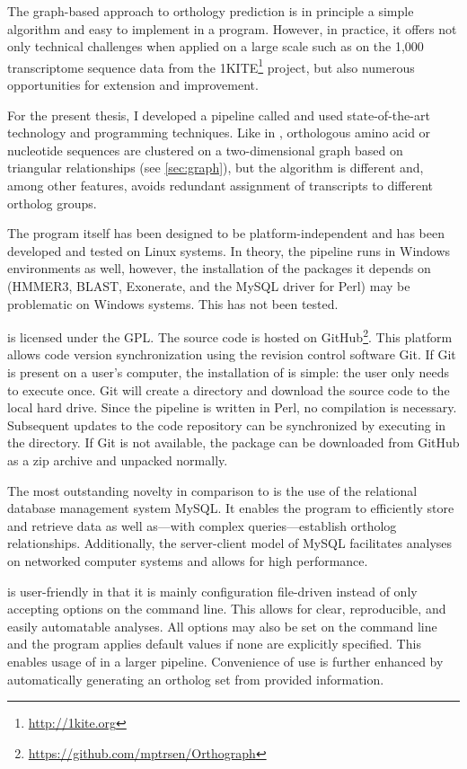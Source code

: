 The graph-based approach to orthology prediction is in principle a simple
algorithm and easy to implement in a program. However, in practice, it offers not only technical
challenges when applied on a large scale such as on the 1,000 transcriptome
sequence data from the 1KITE\footnote{\url{http://1kite.org}} project, but also
numerous opportunities for extension and improvement. 

For the present thesis, I developed a pipeline called \pname
and used state-of-the-art technology and
programming techniques. Like in \hamstr, orthologous amino acid or nucleotide
sequences are clustered on a two-dimensional graph based on triangular
relationships (see \autoref{sec:graph}), but the algorithm is different and,
among other features, avoids redundant assignment of transcripts to different
ortholog groups.

The program itself has been designed to be platform-independent and has been
developed and tested on Linux systems.  In theory, the pipeline runs in Windows
environments as well, however, the installation of the packages it depends on
(HMMER3, BLAST, Exonerate, and the MySQL driver for Perl) may be problematic on
Windows systems. This has not been tested.

\pname is licensed under the GPL. The source code is hosted on
GitHub\footnote{\url{https://github.com/mptrsen/Orthograph}}. This platform
allows code version synchronization using the revision control software Git. If
Git is present on a user's computer, the installation of \pname is simple: the
user only needs to execute  once. Git will create a directory and
download the source code to the local hard drive. Since the pipeline is written
in Perl, no compilation is necessary. Subsequent updates to the code repository
can be synchronized by executing  in the \pname directory. If Git
is not available, the package can be downloaded from GitHub as a zip archive and
unpacked normally.

The most outstanding novelty in comparison to \hamstr is the use of the
relational database management system MySQL. It enables the program to
efficiently store and retrieve data as well as---with complex 
queries---establish ortholog relationships. Additionally, the server-client
model of MySQL facilitates analyses on networked computer systems and allows for
high performance.

\pname is user-friendly in that it is mainly configuration file-driven instead
of only accepting options on the command line. This allows for clear,
reproducible, and easily automatable analyses. All options may also be set on
the command line and the program applies default values if none are explicitly
specified. This enables usage of \pname in a larger pipeline. Convenience of use
is further enhanced by automatically generating an ortholog set from provided
information.

